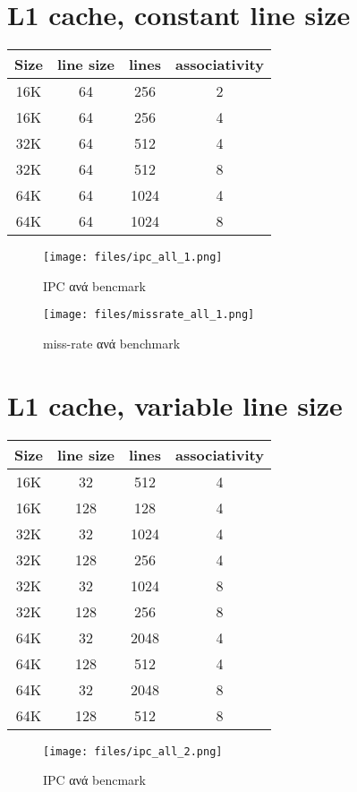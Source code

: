 \documentclass[a4paper,9pt]{article}
\begin{document}
\def\thesection {\roman{section}: }



\section{L1 cache, constant line size}
\begin{tabular}{c c c c}
    Size & line size & lines & associativity\\ 
    \hline
    \hline
    16K   & 64 &  256  & 2\\
    16K   & 64 &  256  & 4\\
    \hline
    32K   & 64 &  512  & 4\\
    32K   & 64 &  512  & 8\\
    \hline
    64K   & 64 &  1024 & 4\\
    64K   & 64 &  1024 & 8\\
\end{tabular}
\begin{figure}[H]
    \texttt{[image: files/ipc\_all\_1.png]}
    \caption{IPC ανά bencmark}
\end{figure}

\begin{figure}[H]
    \texttt{[image: files/missrate\_all\_1.png]}
    \caption{miss-rate ανά benchmark}
\end{figure}

\section{L1 cache, variable line size}
\begin{tabular}{c c c c}
    Size & line size &lines & associativity\\ 
    \hline
    \hline
    16K & 32    & 512   & 4\\
    16K & 128   & 128   & 4\\
    \hline
    32K & 32    & 1024  & 4\\
    32K & 128   & 256   & 4\\
    32K & 32    & 1024  & 8\\
    32K & 128   & 256   & 8\\
    \hline
    64K & 32    & 2048  & 4\\
    64K & 128   & 512   & 4\\
    64K & 32    & 2048  & 8\\
    64K & 128   & 512   & 8\\
\end{tabular}
\begin{figure}[H]
    \texttt{[image: files/ipc\_all\_2.png]}
    \caption{IPC ανά bencmark}
\end{figure}
\end{document}
